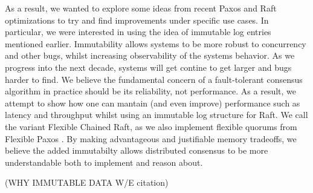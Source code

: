 As a result, we wanted to explore some ideas from recent Paxos and Raft optimizations to try and find improvements under specific use cases. In particular, we were interested in using the idea 
of immutable log entries mentioned earlier. Immutability allows systems to be more robust to concurrency and other bugs, whilst increasing observability of the systems behavior. 
As we progress into the next decade, systems will get contine to get larger and bugs harder to find.
We believe the fundamental concern of a fault-tolerant consensus algorithm in practice should be its reliability, not performance.
As a result, we attempt to show how one can mantain (and even improve) performance such as latency and throughput whilst using an immutable log structure for Raft. 
We call the variant Flexible Chained Raft, as we also implement flexible quorums from Flexible Paxos \cite{DBLP:journals/corr/HowardMS16}.  
By making advantageous and justifiable memory tradeoffs, we believe the added immutabilty allows distributed consensus to be more understandable both to implement and reason about.

(WHY IMMUTABLE DATA W/E citation) 
